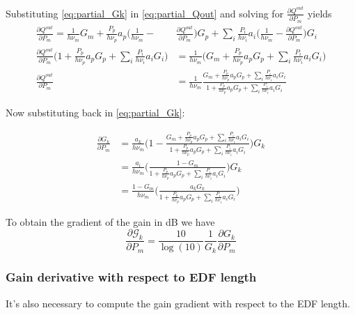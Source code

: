 \documentclass[a4paper]{article}
\begin{document}
Substituting \eqref{eq:partial_Gk} in \eqref{eq:partial_Qout} and solving for $\frac{\partial Q^{out}}{\partial P_m}$ yields
\begin{align} \nonumber
\frac{\partial Q^{out}}{\partial P_m} = \frac{1}{h\nu_m}G_m + \frac{P_p}{h\nu_p}a_p\Big(\frac{1}{h\nu_m} - &\frac{\partial Q^{out}}{\partial P_m}\Big)G_p + \sum_{i}  \frac{P_i}{h\nu_i}a_i\Big(\frac{1}{h\nu_m} - \frac{\partial Q^{out}}{\partial P_m}\Big)G_i \\ \nonumber
\frac{\partial Q^{out}}{\partial P_m}\bigg(1 + \frac{P_p}{h\nu_p}a_pG_p  + \sum_{i}\frac{P_i}{h\nu_i}a_iG_i \bigg) &= \frac{1}{h\nu_m}\bigg(G_m + \frac{P_p}{h\nu_p}a_pG_p + \sum_{i}\frac{P_i}{h\nu_i}a_iG_i\bigg) \\
\frac{\partial Q^{out}}{\partial P_m} &= \frac{1}{h\nu_m}\frac{G_m + \frac{P_p}{h\nu_p}a_pG_p + \sum_{i}\frac{P_i}{h\nu_i}a_iG_i}{1 + \frac{P_p}{h\nu_p}a_pG_p+\sum_{i}\frac{P_i}{h\nu_i}a_iG_i}
\end{align}

Now substituting back in \eqref{eq:partial_Gk}:

\begin{align} \nonumber
\frac{\partial G_k}{\partial P_m} &= \frac{a_k}{h\nu_m}\Bigg(1 - \frac{G_m + \frac{P_p}{h\nu_p}a_pG_p + \sum_{i}\frac{P_i}{h\nu_i}a_iG_i}{1 + \frac{P_p}{h\nu_p}a_pG_p+\sum_{i}\frac{P_i}{h\nu_i}a_iG_i}\Bigg)G_k \\ \nonumber
& = \frac{a_i}{h\nu_m}\Bigg(\frac{1 - G_m}{1 + \frac{P_p}{h\nu_p}a_pG_p + \sum_i\frac{P_i}{h\nu_i}a_iG_i}\Bigg)G_k \\
& = \frac{1 - G_m}{h\nu_m}\Bigg(\frac{a_kG_k}{1 + \frac{P_p}{h\nu_p}a_pG_p + \sum_i\frac{P_i}{h\nu_i}a_iG_i }\Bigg)
\end{align}

To obtain the gradient of the gain in dB we have
\begin{equation}
	\frac{\partial\mathcal{G}_k}{\partial P_m} = \frac{10}{\log(10)}\frac{1}{G_k}\frac{\partial G_k}{\partial P_m}
\end{equation}

\subsubsection{Gain derivative with respect to EDF length}

It's also necessary to compute the gain gradient with respect to the EDF length.
\end{document}
